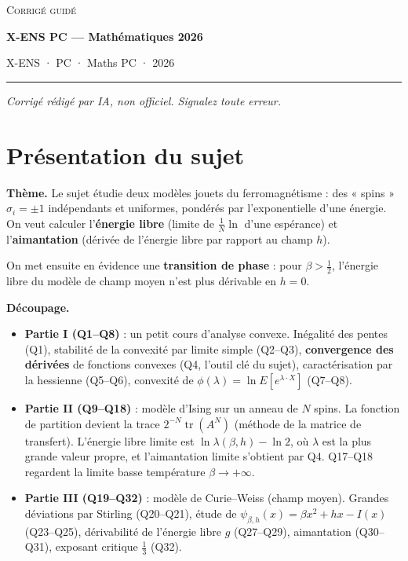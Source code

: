\documentclass[11pt,a4paper]{article}
\providecommand{\tightlist}{\setlength{\itemsep}{0pt}\setlength{\parskip}{0pt}}
\begin{document}
\thispagestyle{plain}
\begin{center}
  {\small\scshape Corrigé guidé}\par\smallskip
  {\LARGE\bfseries X-ENS PC — Mathématiques 2026\par}\medskip
  {\large X-ENS · PC · Maths PC · 2026\par}
\end{center}
\vspace{2pt}\hrule\vspace{8pt}

\emph{Corrigé rédigé par IA, non officiel. Signalez toute erreur.}

\hypertarget{pruxe9sentation-du-sujet}{%
\section{Présentation du sujet}\label{pruxe9sentation-du-sujet}}

\textbf{Thème.} Le sujet étudie deux modèles jouets du ferromagnétisme : des « spins » \(\sigma_i=\pm1\) indépendants et uniformes, pondérés par l'exponentielle d'une énergie. On veut calculer l'\textbf{énergie libre} (limite de \(\frac1N\ln\) d'une espérance) et l'\textbf{aimantation} (dérivée de l'énergie libre par rapport au champ \(h\)).

On met ensuite en évidence une \textbf{transition de phase} : pour \(\beta>\frac12\), l'énergie libre du modèle de champ moyen n'est plus dérivable en \(h=0\).

\textbf{Découpage.}

\begin{itemize}
\tightlist
\item
  \textbf{Partie I (Q1--Q8)} : un petit cours d'analyse convexe. Inégalité des pentes (Q1), stabilité de la convexité par limite simple (Q2--Q3), \textbf{convergence des dérivées} de fonctions convexes (Q4, l'outil clé du sujet), caractérisation par la hessienne (Q5--Q6), convexité de \(\phi(\lambda)=\ln E[e^{\lambda\cdot X}]\) (Q7--Q8).
\item
  \textbf{Partie II (Q9--Q18)} : modèle d'Ising sur un anneau de \(N\) spins. La fonction de partition devient la trace \(2^{-N}\operatorname{tr}(A^N)\) (méthode de la matrice de transfert). L'énergie libre limite est \(\ln\lambda(\beta,h)-\ln2\), où \(\lambda\) est la plus grande valeur propre, et l'aimantation limite s'obtient par Q4. Q17--Q18 regardent la limite basse température \(\beta\to+\infty\).
\item
  \textbf{Partie III (Q19--Q32)} : modèle de Curie--Weiss (champ moyen). Grandes déviations par Stirling (Q20--Q21), étude de \(\psi_{\beta,h}(x)=\beta x^2+hx-I(x)\) (Q23--Q25), dérivabilité de l'énergie libre \(g\) (Q27--Q29), aimantation (Q30--Q31), exposant critique \(\frac13\) (Q32).
\end{itemize}
\end{document}
